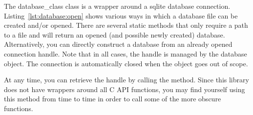 The \gls{database_class} class is a wrapper around a \gls{sqlite} database connection. Listing~\ref{lst:database:open} shows various ways in which a database file can be created and/or opened. There are several static methods that only require a path to a file and will return an opened (and possible newly created) database. Alternatively, you can directly construct a database from an already opened connection handle. Note that in all cases, the handle is managed by the database object. The connection is automatically closed when the object goes out of scope.



At any time, you can retrieve the handle by calling the  method. Since this library does not have wrappers around all C API functions, you may find yourself using this method from time to time in order to call some of the more obscure  functions.
